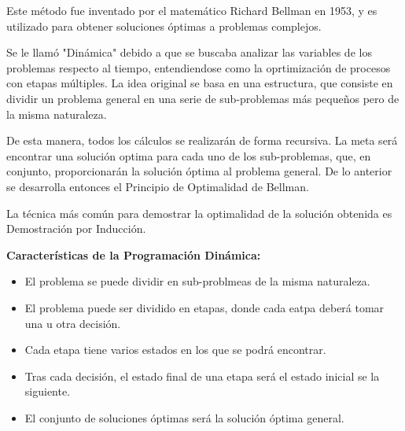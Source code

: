 \documentclass[12pt,twoside]{article}
\begin{document}
\vspace{5mm} %

Este m\'etodo fue inventado por el matem\'atico Richard Bellman en 1953, y es utilizado para obtener soluciones \'optimas a problemas complejos.

\vspace{5mm} %

Se le llam\'o "Din\'amica" debido a que se buscaba analizar las variables de los problemas respecto al tiempo, entendiendose como la oprtimizaci\'on de procesos con etapas m\'ultiples.  La idea original se basa en una estructura, que consiste en dividir un problema general en una serie de sub-problemas m\'as pequeños pero de la misma naturaleza. 

\vspace{5mm} %

De esta manera, todos los c\'alculos se realizar\'an de forma recursiva. La meta ser\'a encontrar una soluci\'on optima para cada uno de los sub-problemas, que, en conjunto, proporcionar\'an la soluci\'on \'optima al problema general. De lo anterior se desarrolla entonces el Principio de Optimalidad de Bellman. 

\vspace{5mm} %

La t\'ecnica m\'as com\'un para demostrar la optimalidad de la soluci\'on obtenida es Demostraci\'on por Inducci\'on.

\vspace{5mm} %

{\bf Caracter\'isticas de la Programaci\'on Din\'amica:}

\begin{itemize}
    \item El problema se puede dividir en sub-problmeas de la misma naturaleza.
    \item El problema puede ser dividido en etapas, donde cada eatpa deber\'a tomar una u otra decisi\'on.
    \item Cada etapa tiene varios estados en los que se podr\'a encontrar.
    \item Tras cada decisi\'on, el estado final de una etapa ser\'a el estado inicial se la siguiente.
    \item El conjunto de soluciones \'optimas ser\'a la soluci\'on \'optima general.
\end{itemize}

\newpage
\end{document}
